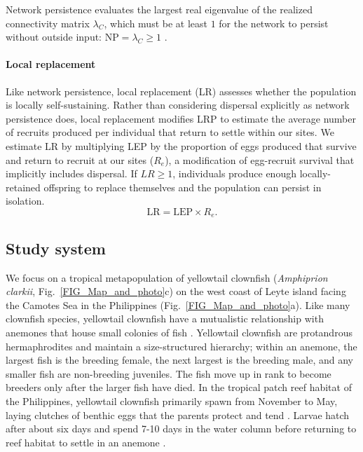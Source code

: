 \documentclass[12pt, oneside]{article}   	%
\begin{document}
Network persistence evaluates the largest real eigenvalue of the realized connectivity matrix $\lambda_C$, which must be at least $1$ for the network to persist without outside input: $\text{NP} = \lambda_C \geq 1$ \citep[e.g.][]{hastings_persistence_2006, white_population_2010, burgess2014beyond}.

\paragraph*{Local replacement}

Like network persistence, local replacement (LR) assesses whether the population is locally self-sustaining. Rather than considering dispersal explicitly as network persistence does, local replacement modifies LRP to estimate the average number of recruits produced per individual that return to settle within our sites. We estimate LR by multiplying LEP by the proportion of eggs produced that survive and return to recruit at our sites ($R_e$), a modification of egg-recruit survival that implicitly includes dispersal. If $LR \geq 1$, individuals produce enough locally-retained offspring to replace themselves and the population can persist in isolation. %
\begin{equation}
\text{LR} = \text{LEP} \times R_e. \label{EQN_LR}
\end{equation}

\subsection*{Study system}

We focus on a tropical metapopulation of yellowtail clownfish (\textit{Amphiprion clarkii}, Fig.\ \ref{FIG_Map_and_photo}c) on the west coast of Leyte island facing the Camotes Sea in the Philippines (Fig.\ \ref{FIG_Map_and_photo}a). Like many clownfish species, yellowtail clownfish have a mutualistic relationship with anemones that house small colonies of fish \citep{buston2003social, fautin1992field}. Yellowtail clownfish are protandrous hermaphrodites and maintain a size-structured hierarchy; within an anemone, the largest fish is the breeding female, the next largest is the breeding male, and any smaller fish are non-breeding juveniles. The fish move up in rank to become breeders only after the larger fish have died. In the tropical patch reef habitat of the Philippines, yellowtail clownfish primarily spawn from November to May, laying clutches of benthic eggs that the parents protect and tend \citep{ochi1989mating, holtswarth2017fecundity}. Larvae hatch after about six days and spend 7-10 days in the water column before returning to reef habitat to settle in an anemone \citep{fautin1992field}.
\end{document}
